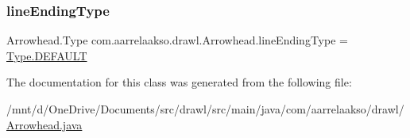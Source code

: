 \subsubsection{\texorpdfstring{lineEnding\+Type}{arrowheadType}}
{\footnotesize\ttfamily Arrowhead.\+Type com.\+aarrelaakso.\+drawl.\+Arrowhead.\+lineEnding\+Type = \hyperlink{enumcom_1_1aarrelaakso_1_1drawl_1_1_arrowhead_1_1_type_ae4c70d3cd0853637fba791f2bb29cd8e}{Type.\+D\+E\+F\+A\+U\+LT}\hspace{0.3cm}{\ttfamily [private]}}



The documentation for this class was generated from the following file\+:\begin{DoxyCompactItemize}
\item 
/mnt/d/\+One\+Drive/\+Documents/src/drawl/src/main/java/com/aarrelaakso/drawl/\hyperlink{_arrowhead_8java}{Arrowhead.\+java}\end{DoxyCompactItemize}
